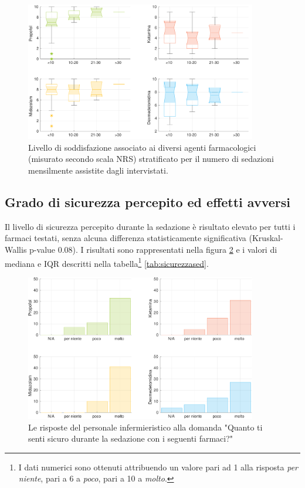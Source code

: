 \begin{figure}[!h]
    \centering
    \includegraphics[width=0.9\textwidth]{Figure/qualita-strat-frequenza.pdf}
    \caption{Livello di soddisfazione associato ai diversi agenti farmacologici (misurato secondo scala NRS) stratificato per il numero di sedazioni mensilmente assistite dagli intervistati.}
    \label{fig:qualitafrequenza}
\end{figure}


\subsection*{Grado di sicurezza percepito ed effetti avversi}

Il livello di sicurezza percepito durante la sedazione è risultato elevato per tutti i farmaci testati, senza alcuna differenza statisticamente significativa (Kruskal-Wallis p-value 0.08). I risultati sono rappresentati nella figura \ref{fig:sicurezza} e i valori di mediana e IQR descritti nella tabella\footnote{I dati numerici sono ottenuti attribuendo un valore pari ad 1 alla risposta \emph{per niente}, pari a 6 a \emph{poco}, pari a 10 a \emph{molto}.} \ref{tab:sicurezzased}.

\begin{figure}[!h]
    \centering
    \includegraphics[width=0.9\textwidth]{Figure/sicurezza.pdf}
    \caption{Le risposte del personale infermieristico alla domanda "Quanto ti senti sicuro durante la sedazione con i seguenti farmaci?"}
    \label{fig:sicurezza}
\end{figure}

